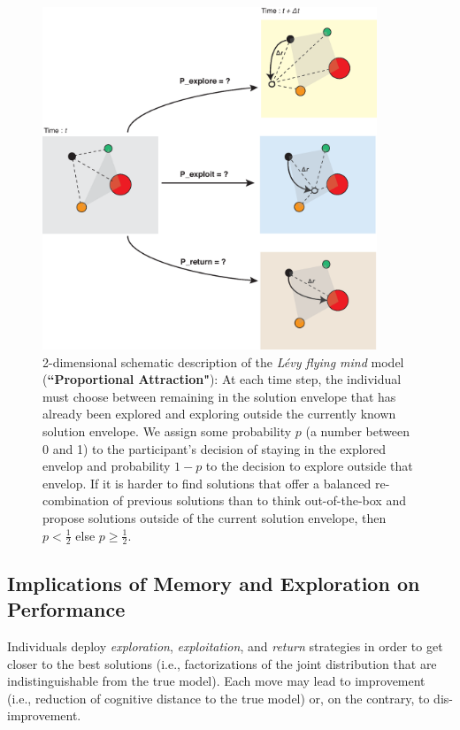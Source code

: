 \begin{figure}[h!]
\begin{center}
\includegraphics[width=10cm]{figures/schematic_displacement.eps}
\caption{2-dimensional schematic description of the {\it L\'evy flying mind} model ({\bf ``Proportional Attraction"}): At each time step, the individual must choose between remaining in the solution envelope that has already been explored and exploring outside the currently known solution envelope.  We assign some probability $p$ (a number between 0 and 1) to the participant's decision of staying in the explored envelop and probability $1-p$ to the decision to explore outside that envelop.  If it is harder to find solutions that offer a balanced re-combination of previous solutions than to think out-of-the-box and propose solutions outside of the current solution envelope, then $p < \frac{1}{2}$ else $p \geq \frac{1}{2}$.}
\label{fig:schematic}
\end{center}
\end{figure}










\subsection{Implications of Memory and Exploration on Performance}
Individuals deploy {\it exploration}, {\it exploitation}, and {\it return} strategies in order to get closer to the best solutions (i.e., factorizations of the joint distribution that are indistinguishable from the true model). Each move may lead to improvement (i.e., reduction of cognitive distance to the true model) or, on the contrary, to dis-improvement. 

